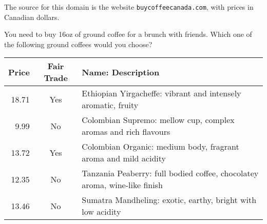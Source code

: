 
The source for this domain is the website \texttt{buycoffeecanada.com}, with prices in Canadian dollars.

\begin{tcolorbox}
You need to buy 16oz of ground coffee for a brunch with friends.
Which one of the following ground coffees would you choose?

\begin{tabular}{rcl}
\hline
Price & Fair Trade & Name: Description \\
\hline
18.71 & Yes & Ethiopian Yirgacheffe: vibrant and intensely aromatic, fruity \\
9.99 & No & Colombian Supremo: mellow cup, complex aromas and rich flavours \\
13.72 & Yes & Colombian Organic: medium body, fragrant aroma and mild acidity \\
12.35 & No & Tanzania Peaberry: full bodied coffee, chocolatey aroma, wine-like finish \\
13.46 & No & Sumatra Mandheling: exotic, earthy, bright with low acidity \\
\hline
\end{tabular}
\end{tcolorbox}
